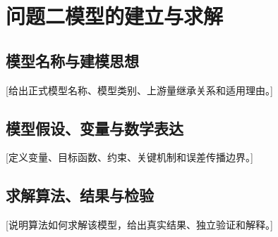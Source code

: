 \section{问题二模型的建立与求解}
\subsection{模型名称与建模思想}
[给出正式模型名称、模型类别、上游量继承关系和适用理由。]
\subsection{模型假设、变量与数学表达}
[定义变量、目标函数、约束、关键机制和误差传播边界。]
\subsection{求解算法、结果与检验}
[说明算法如何求解该模型，给出真实结果、独立验证和解释。]
